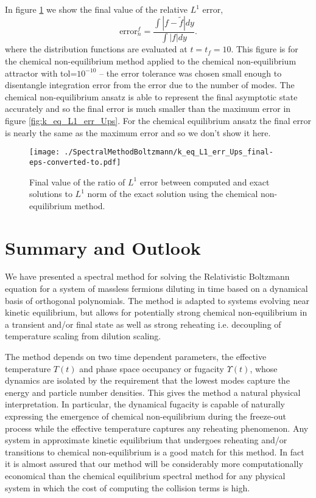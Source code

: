 In figure \ref{fig:k_eq_L1_err_Ups_final} we show the final value of the relative $L^1$ error,
\begin{equation}\label{f_err}
\text{error}_{n}^f= \frac{\int |f-\tilde{f}|dy}{\int |f|dy}.
\end{equation}
where the distribution functions are evaluated at $t=t_f=10$. This figure is for the chemical non-equilibrium method applied to the chemical non-equilibrium attractor with tol=$10^{-10}$ -- the error tolerance was chosen small enough to disentangle integration error from the error due to the number of modes.  The chemical non-equilibrium ansatz is able to represent the final asymptotic state accurately and so the final error is much smaller than the maximum error in figure \ref{fig:k_eq_L1_err_Ups}.  For the chemical equilibrium ansatz the final error is nearly the same as the maximum error and so we don't show it here.

\begin{figure}[H]
\centerline{\texttt{[image: ./SpectralMethodBoltzmann/k\_eq\_L1\_err\_Ups\_final-eps-converted-to.pdf]}}
\caption{Final value of the ratio  of $L^1$ error between computed and exact solutions to $L^1$ norm of the exact solution using the chemical non-equilibrium method.}\label{fig:k_eq_L1_err_Ups_final}
 \end{figure}

\section{Summary and Outlook}
We have presented a spectral method for solving the Relativistic Boltzmann equation for a system  of massless fermions  diluting in time based on a dynamical basis of orthogonal polynomials.  The method is adapted to systems evolving near kinetic equilibrium, but allows for potentially strong chemical non-equilibrium in a transient and/or final state as well as strong reheating i.e. decoupling of temperature scaling from dilution scaling.  

The method depends on two time dependent parameters, the effective temperature $T(t)$ and phase space occupancy or fugacity $\Upsilon(t)$, whose dynamics are isolated by the requirement that the lowest modes capture the energy and particle number densities.  This gives the method a natural physical interpretation.  In particular, the dynamical fugacity is capable of naturally expressing the emergence of chemical non-equilibrium during the freeze-out process while the effective temperature captures any reheating phenomenon. Any system in approximate kinetic equilibrium that undergoes reheating and/or transitions to chemical non-equilibrium is a good match for this method.  In fact it is almost assured that our method will be considerably more computationally economical than the chemical equilibrium spectral method for any physical system in which the cost of computing the collision terms is high.

